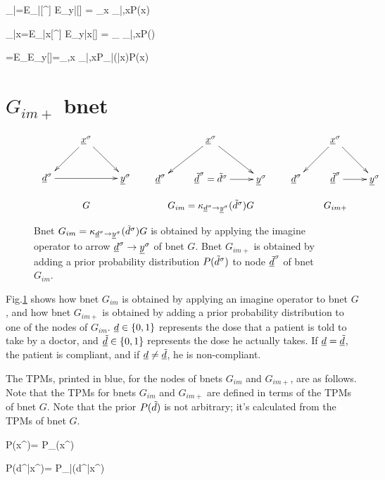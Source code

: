 \beq
\caly_{|\td}=E_{\s|\td}[\rvy^\s]
\rarrow E_{y|\td}[\rvy]
=
\sum_x \caly_{|\td,x}P(x)
\eeq

\beq
\caly_{|x}=E_{\s|x}[\rvy^\s]
\rarrow E_{y|x}[\rvy]
=
\sum_{\td} \caly_{|\td,x}P(\td)
\eeq


\beq
\caly=E_\s[\rvy^\s]
\rarrow E_y[\rvy]=\sum_{\td,x}
 \caly_{|\td,x}P_{\rvd|\rvx}(\td|x)P(x)
\eeq

\section{$G_{im+}$ bnet}


\begin{figure}[h!]
$$
\begin{array}{ccccc}
\xymatrix{
&\rvx^\s\ar[dl]\ar[dr]
\\
\rvd^\s\ar[rr]&&\rvy^\s
}
&&
\xymatrix{
&\rvx^\s\ar[dl]\ar[dr]
\\
\rvd^\s&\rvtd^\s=\td^\s\ar[r]&\rvy^\s
}
&&
\xymatrix{
&\rvx^\s\ar[dl]\ar[dr]
\\
\rvd^\s&\rvtd^\s\ar[r]&\rvy^\s
}
\\
\\
G&&G_{im}= \kappa_{\rvd^\s\rarrow\rvy^\s}
(\td^\s)G&&G_{im+}
\end{array}
$$
\caption{Bnet 
$G_{im}= \kappa_{{\underline{d}}^\sigma\rightarrow{\underline{y}}^\sigma}
({\tilde{d}}^\sigma)G$
is obtained by applying 
the imagine operator to arrow 
${\underline{d}}^\sigma\rightarrow{\underline{y}}^\sigma$
of bnet $G$. Bnet $ G_{im+}$
is obtained
by adding a prior
probability distribution $P({\tilde{d}}^\sigma)$
to node ${\underline{\tilde{d}}}^\sigma$ of
bnet $G_{im}$.
} 
\label{fig-po-G-im}
\end{figure}

Fig.\ref{fig-po-G-im}
shows how bnet $G_{im}$
is obtained by applying 
an imagine operator to bnet $G$,
and how bnet $G_{im+}$
is obtained  by adding
a prior
probability distribution to
one of the nodes of $G_{im}$.
${\underline{d}}\in \{0,1\}$ represents the
dose that a patient 
is told to take by a doctor, and
${\underline{\tilde{d}}}\in \{0,1\}$ represents the 
dose he actually takes.
If ${\underline{d}}={\underline{\tilde{d}}}$, the
patient is compliant,
and if ${\underline{d}}\neq{\underline{\tilde{d}}}$, he is
non-compliant.


The TPMs, printed in blue,
for the nodes of bnets $G_{im}$ and $G_{im+}$,
are as follows.
Note that the TPMs
for bnets  $G_{im}$ and $G_{im+}$
are defined in terms
of the TPMs of bnet $G$.
Note that
the prior
$P({\tilde{d}})$ is not arbitrary;
it's calculated from
the TPMs of bnet $G$.


\beq\color{blue}
P(x^\s)=
P_{\rvx}(x^\s)
\eeq

\beq\color{blue}
P(d^\s|x^\s)=
P_{\rvd|\rvx}(d^\s|x^\s)
\eeq

